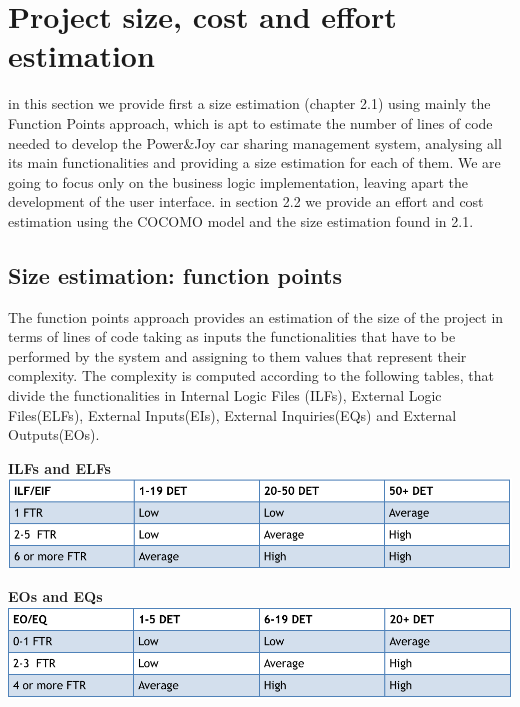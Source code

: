 \documentclass{article}
\begin{document}
\begin{flushleft}
\begin{itemize}
\end{itemize}

\newpage
\section{Project size, cost and effort estimation} %
in this section we provide first a size estimation (chapter 2.1) using mainly the Function Points approach, which is apt to estimate the number of lines of code needed to develop the Power\&Joy car sharing management system, analysing all its main functionalities and providing a size estimation for each of them. We are going to focus only on the business logic implementation, leaving apart the development of the user interface.
in section 2.2 we provide an effort and cost estimation using the COCOMO model and the size estimation found in 2.1.



\subsection{Size estimation: function points} %

The function points approach provides an estimation of the size of the project in terms of lines of code taking as inputs the functionalities that have to be performed by the system and assigning to them values that represent their complexity. 
The complexity is computed according to the following tables, that divide the functionalities in Internal Logic Files (ILFs), External Logic Files(ELFs), External Inputs(EIs), External Inquiries(EQs) and External Outputs(EOs).
\vspace{0.5cm}

\textbf{ILFs and ELFs }\\
\vspace{0.5cm}
\includegraphics[scale=0.3]{s12}
\vspace{0.5cm}
 
\textbf{EOs and EQs}\\
\vspace{0.5cm}
\includegraphics[scale=0.3]{s11}
\vspace{0.5cm}





\end{flushleft}
\end{document}
